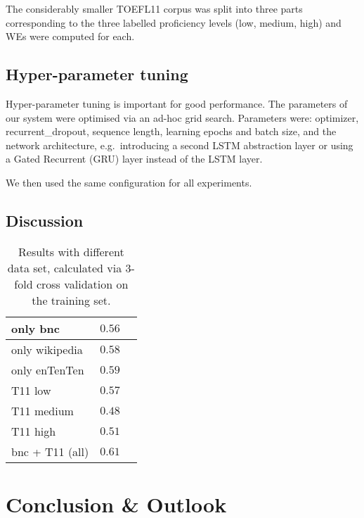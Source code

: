 \documentclass[11pt,a4paper]{article}
\begin{document}
The considerably smaller TOEFL11 corpus was split into three parts corresponding to the three labelled proficiency levels (low, medium, high) and WEs were computed for each.

\subsection{Hyper-parameter tuning} %
Hyper-parameter tuning is important for good performance. The parameters of our system were optimised via an ad-hoc grid search. Parameters were:
optimizer, recurrent\_dropout, sequence length, learning epochs and batch size, and the network architecture, e.g.~introducing a second LSTM abstraction layer or using a Gated Recurrent (GRU) layer instead of the LSTM layer.

We then used the same configuration for all experiments.

\subsection{Discussion} %
\begin{table}[h]
\begin{center}
\begin{tabular}{l|r|r}
\hline
only bnc   		& $0.56$ \\ \hline
only wikipedia 	& $0.58$ \\ \hline
only enTenTen	& $0.59$ \\ \hline
\hline
T11 low 		& $0.57$ \\ \hline
T11 medium		& $0.48$ \\ \hline
T11 high		& $0.51$ \\ \hline
\hline
bnc + T11 (all) & $0.61$ \\ \hline
\end{tabular}
\end{center}
\caption{\label{tab:results}Results with different data set, calculated via 3-fold cross validation on the training set.} 
\end{table}


\section{Conclusion \& Outlook} %
\label{sec:conclusion}




\end{document}
